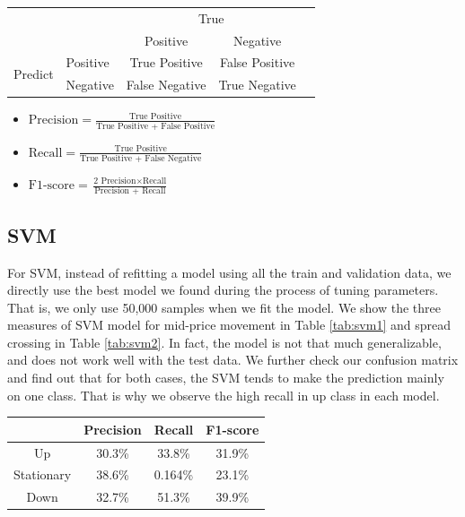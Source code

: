 \documentclass[11pt]{article}
\begin{document}
\begin{center}
 \label{tab:cm}
\begin{tabular}{l|l|c|c|c}
\multicolumn{2}{c}{}&\multicolumn{2}{c}{True}&\\
\cline{3-4}
\multicolumn{2}{c|}{}&Positive&Negative\\
\cline{2-4}
\multirow{2}{*}{Predict}& Positive & True Positive & False Positive\\
\cline{2-4}
& Negative & False Negative & True Negative\\
\cline{2-4}
\end{tabular}
\end{center}

\newpage

\begin{itemize}
  \item $\mbox{Precision} = \frac{\mbox{True Positive}}{\mbox{True Positive + False Positive}}$
  \item $\mbox{Recall} = \frac{\mbox{True Positive}}{\mbox{True Positive + False Negative}}$
  \item $\mbox{F1-score} = \frac{\mbox{2 Precision}\times\mbox{Recall}}{\mbox{Precision + Recall}}$
\end{itemize}

\subsection{SVM}
For SVM, instead of refitting a model using all the train and validation data, we directly use the best model we found during the process of tuning parameters. That is, we only use 50,000 samples when we fit the model. We show the three measures of SVM model for mid-price movement in Table \ref{tab:svm1} and spread crossing in Table \ref{tab:svm2}. In fact, the model is not that much generalizable, and does not work well with the test data. We further check our confusion matrix and find out that for both cases, the SVM tends to make the prediction mainly on one class. That is why we observe the high recall in up class in each model.

\begin{center}
   \label{tab:svm1} 
  \begin{tabular}{|c | c | c | c|} 
    \hline
     & Precision & Recall & F1-score  \\
    \hline
    Up & 30.3\% & 33.8\% & 31.9\% \\ 
    \hline
    Stationary & 38.6\% & 0.164\% & 23.1\% \\
    \hline
    Down & 32.7\% & 51.3\% & 39.9\%  \\
    \hline
  \end{tabular}
\end{center}
\end{document}
